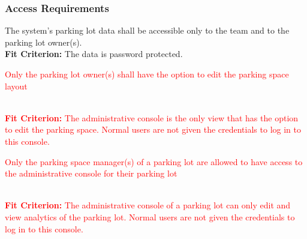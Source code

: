 \documentclass[12pt,letterpaper]{article}
\begin{document}
\subsubsection{Access Requirements}
\begin{enumerate}[{SR}1.] 
    \item The system's parking lot data shall be accessible only to the team and
    to the parking lot owner(s).\label{asr1} \\
    \textbf{Fit Criterion:} The data is password protected.
    \textcolor{red}{\item Only the parking lot owner(s) shall have the option to
    edit the parking space layout} \label{asr2} \\
    \textcolor{red}{\textbf{Fit Criterion:} The administrative console is the
    only view that has the option to edit the parking space. Normal users are
    not given the credentials to log in to this console.} \textcolor{red}{\item
    Only the parking space manager(s) of a parking lot are allowed to have
    access to the administrative console for their parking lot} \label{asr3}\\
    \textcolor{red}{\textbf{Fit Criterion:} The administrative console of a
    parking lot can only edit and view analytics of the parking lot. Normal
    users are not given the credentials to log in to this console.}
\end{enumerate}
\end{document}
